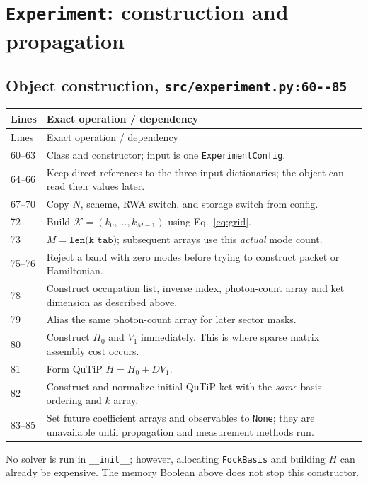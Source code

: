 \documentclass[11pt,a4paper]{article}
\newcommand{\code}[1]{\nolinkurl{#1}}
\begin{document}
\section{\code{Experiment}: construction and propagation}
\subsection{Object construction, \code{src/experiment.py:60--85}}

\begin{longtable}{p{}p{}}
\toprule Lines & Exact operation / dependency\\\midrule\endfirsthead
\toprule Lines & Exact operation / dependency\\\midrule\endhead
60--63 & Class and constructor; input is one \code{ExperimentConfig}.\\
64--66 & Keep direct references to the three input dictionaries; the object can read their values later.\\
67--70 & Copy $N$, scheme, RWA switch, and storage switch from config.\\
72 & Build $\mathcal K=(k_0,\ldots,k_{M-1})$ using Eq.~\eqref{eq:grid}.\\
73 & $M=\texttt{len(k\_tab)}$; subsequent arrays use this \emph{actual} mode count.\\
75--76 & Reject a band with zero modes before trying to construct packet or Hamiltonian.\\
78 & Construct occupation list, inverse index, photon-count array and ket dimension as described above.\\
79 & Alias the same photon-count array for later sector masks.\\
80 & Construct $H_0$ and $V_1$ immediately. This is where sparse matrix assembly cost occurs.\\
81 & Form QuTiP $H=H_0+D V_1$.\\
82 & Construct and normalize initial QuTiP ket with the \emph{same} basis ordering and $k$ array.\\
83--85 & Set future coefficient arrays and observables to \code{None}; they are unavailable until propagation and measurement methods run.\\
\bottomrule
\end{longtable}
No solver is run in \code{__init__}; however, allocating \code{FockBasis}
and building $H$ can already be expensive. The memory Boolean above does not
stop this constructor.
\end{document}
